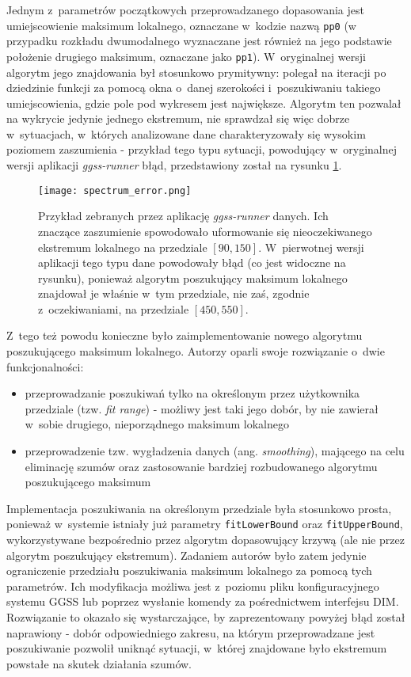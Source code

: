 Jednym z~parametrów początkowych przeprowadzanego dopasowania jest umiejscowienie maksimum lokalnego, oznaczane w~kodzie nazwą \lstinline{pp0} (w przypadku rozkładu dwumodalnego wyznaczane jest również na jego podstawie położenie drugiego maksimum, oznaczane jako \lstinline{pp1}). W~oryginalnej wersji algorytm jego znajdowania był stosunkowo prymitywny: polegał na iteracji po dziedzinie funkcji za pomocą okna o~danej szerokości i~poszukiwaniu takiego umiejscowienia, gdzie pole pod wykresem jest największe. Algorytm ten pozwalał na wykrycie jedynie jednego ekstremum, nie sprawdzał się więc dobrze w~sytuacjach, w~których analizowane dane charakteryzowały się wysokim poziomem zaszumienia - przykład tego typu sytuacji, powodujący w~oryginalnej wersji aplikacji \emph{ggss-runner} błąd, przedstawiony został na rysunku \ref{fig:spectrum_error}.

\begin{figure}[H]
\centering
\texttt{[image: spectrum\_error.png]}
\caption{Przykład zebranych przez aplikację \emph{ggss-runner} danych. Ich znaczące zaszumienie spowodowało uformowanie się nieoczekiwanego ekstremum lokalnego na przedziale $[90, 150]$. W~pierwotnej wersji aplikacji tego typu dane powodowały błąd (co jest widoczne na rysunku), ponieważ algorytm poszukujący maksimum lokalnego znajdował je właśnie w~tym przedziale, nie zaś, zgodnie z~oczekiwaniami, na przedziale $[450, 550]$.}
\label{fig:spectrum_error}
\end{figure}

Z~tego też powodu konieczne było zaimplementowanie nowego algorytmu poszukującego maksimum lokalnego. Autorzy oparli swoje rozwiązanie o~dwie funkcjonalności: 
\begin{itemize}
    \item przeprowadzanie poszukiwań tylko na określonym przez użytkownika przedziale (tzw. \emph{fit range}) - możliwy jest taki jego dobór, by nie zawierał w~sobie drugiego, nieporządnego maksimum lokalnego
    \item przeprowadzenie tzw. wygładzenia danych (ang. \emph{smoothing}), mającego na celu eliminację szumów oraz zastosowanie bardziej rozbudowanego algorytmu poszukującego maksimum
\end{itemize}

Implementacja poszukiwania na określonym przedziale była stosunkowo prosta, ponieważ w~systemie istniały już parametry \lstinline{fitLowerBound} oraz \lstinline{fitUpperBound}, wykorzystywane bezpośrednio przez algorytm dopasowujący krzywą (ale nie przez algorytm poszukujący ekstremum). Zadaniem autorów było zatem jedynie ograniczenie przedziału poszukiwania maksimum lokalnego za pomocą tych parametrów. Ich modyfikacja możliwa jest z~poziomu pliku konfiguracyjnego systemu GGSS lub poprzez wysłanie komendy za pośrednictwem interfejsu DIM. Rozwiązanie to okazało się wystarczające, by zaprezentowany powyżej błąd został naprawiony - dobór odpowiedniego zakresu, na którym przeprowadzane jest poszukiwanie pozwolił uniknąć sytuacji, w~której znajdowane było ekstremum powstałe na skutek działania szumów. 

